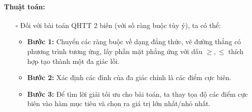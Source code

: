 \documentclass{article}
\begin{document}
\paragraph{Thuật toán:}
\begin{itemize}
    \item [$\square$] Đối với bài toán QHTT 2 biến (với số ràng buộc tùy ý), ta có thể:
    \begin{itemize}[label=\textbullet]
        \item \textbf{Bước 1:} Chuyển các ràng buộc về dạng đẳng thức, vẽ đường thẳng có phương trình tương ứng, lấy phần mặt phẳng ứng với dấu $\geq , \leq$ thích hợp tạo thành một đa giác lồi.
        \item \textbf{Bước 2:} Xác định các đỉnh của đa giác chính là các điểm cực biên.
        \item \textbf{Bước 3:} Để tìm lời giải tối ưu cho bài toán, ta thay tọa độ các điểm cực biên vào hàm mục tiêu và chọn ra giá trị lớn nhất/nhỏ nhất.
    \end{itemize}
\end{itemize}
\end{document}
